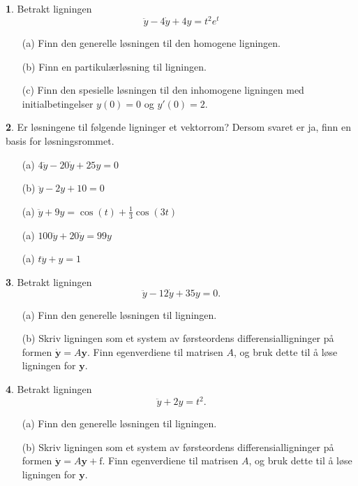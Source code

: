 \documentclass{article}
\theoremstyle{definition}
\newtheorem{oppg}{}
\theoremstyle{remark}
\begin{document}
\begin{multicols*}{2}
\begin{oppg}  
  Betrakt ligningen
  \begin{equation*}
    \ddot{y} - 4\dot{y} + 4y = t^2 e^t
  \end{equation*}
  \begin{itemize}
    \item[(a)] Finn den generelle løsningen til den homogene ligningen.
    \item[(b)] Finn en partikulærløsning til ligningen.
    \item[(c)] Finn den spesielle løsningen til den inhomogene ligningen med initialbetingelser $y(0) = 0$ og $y'(0) = 2$.
  \end{itemize}
\end{oppg}

\begin{oppg}
  Er løsningene til følgende ligninger et vektorrom? Dersom svaret er ja, finn en basis for løsningsrommet.
  \begin{itemize}
    \item[(a)] $4\ddot{y} - 20\dot{y} + 25y = 0$
    \item[(b)] $\ddot{y} - 2y + 10 = 0$
    \item[(a)] $\ddot{y} + 9y = \cos(t) + \frac{1}{3} \cos(3t)$
    \item[(a)] $100\ddot{y} + 20\dot{y} = 99y$
    \item[(a)] $t \ddot{y} + y = 1$ 
  \end{itemize}
\end{oppg}

\begin{oppg}  
  Betrakt ligningen
  \begin{equation*}
    \ddot{y} - 12\dot{y} + 35y = 0.
  \end{equation*}
  \begin{itemize}
    \item[(a)] Finn den generelle løsningen til ligningen.
    \item[(b)] Skriv ligningen som et system av førsteordens differensialligninger på formen $\dot{\boldsymbol{y}}= A\boldsymbol{y}$. Finn egenverdiene til matrisen $A$, og bruk dette til å løse ligningen for $\boldsymbol{y}$.
  \end{itemize}
\end{oppg}

\begin{oppg}  
  Betrakt ligningen
  \begin{equation*}
    \ddot{y} + 2y = t^2.
  \end{equation*}
  \begin{itemize}
    \item[(a)] Finn den generelle løsningen til ligningen.
    \item[(b)] Skriv ligningen som et system av førsteordens differensialligninger på formen $\dot{\boldsymbol{y}}= A\boldsymbol{y} + \boldsymbol{\mathrm{f}}$. Finn egenverdiene til matrisen $A$, og bruk dette til å løse ligningen for $\boldsymbol{y}$.
  \end{itemize}
\end{oppg}


\end{multicols*}
\end{document}
